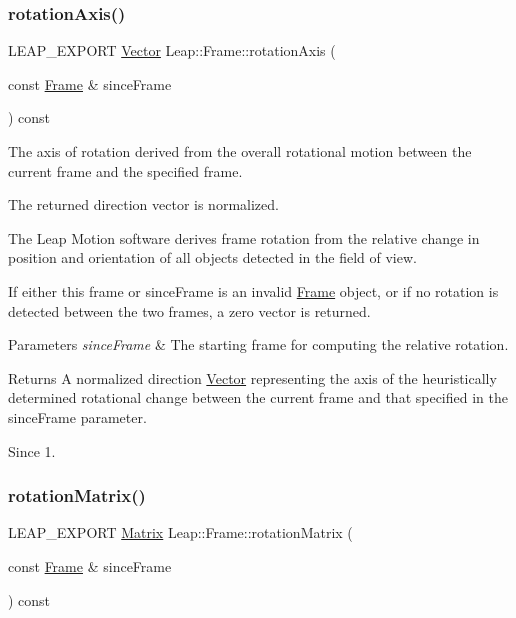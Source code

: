 \subsubsection{\texorpdfstring{rotation\+Axis()}{rotationAxis()}}
{\footnotesize\ttfamily L\+E\+A\+P\+\_\+\+E\+X\+P\+O\+RT \hyperlink{struct_leap_1_1_vector}{Vector} Leap\+::\+Frame\+::rotation\+Axis (\begin{DoxyParamCaption}\item[{const \hyperlink{class_leap_1_1_frame}{Frame} \&}]{since\+Frame }\end{DoxyParamCaption}) const}

The axis of rotation derived from the overall rotational motion between the current frame and the specified frame.

The returned direction vector is normalized.


\begin{DoxyCodeInclude}
\end{DoxyCodeInclude}


The Leap Motion software derives frame rotation from the relative change in position and orientation of all objects detected in the field of view.

If either this frame or since\+Frame is an invalid \hyperlink{class_leap_1_1_frame}{Frame} object, or if no rotation is detected between the two frames, a zero vector is returned.


\begin{DoxyParams}{Parameters}
{\em since\+Frame} & The starting frame for computing the relative rotation. \\
\hline
\end{DoxyParams}
\begin{DoxyReturn}{Returns}
A normalized direction \hyperlink{struct_leap_1_1_vector}{Vector} representing the axis of the heuristically determined rotational change between the current frame and that specified in the since\+Frame parameter. 
\end{DoxyReturn}
\begin{DoxySince}{Since}
1. 
\end{DoxySince}
\mbox{\label{class_leap_1_1_frame_a628403500e883a757b15e50d3130c2a8}} 
\subsubsection{\texorpdfstring{rotation\+Matrix()}{rotationMatrix()}}
{\footnotesize\ttfamily L\+E\+A\+P\+\_\+\+E\+X\+P\+O\+RT \hyperlink{struct_leap_1_1_matrix}{Matrix} Leap\+::\+Frame\+::rotation\+Matrix (\begin{DoxyParamCaption}\item[{const \hyperlink{class_leap_1_1_frame}{Frame} \&}]{since\+Frame }\end{DoxyParamCaption}) const}

